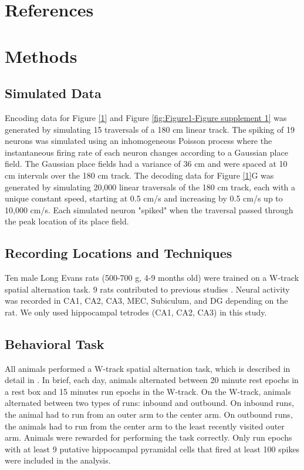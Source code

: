 \documentclass[times, twoside]{zHenriquesLab-StyleBioRxiv}
\begin{document}
\section*{References}


\onecolumn
\newpage

\section*{Methods}

\subsection*{Simulated Data}
Encoding data for Figure \ref{1} and Figure \ref{fig:Figure1-Figure supplement 1} was generated by simulating 15 traversals of a 180 cm linear track. The spiking of 19 neurons was simulated using an inhomogeneous Poisson process where the instantaneous firing rate of each neuron changes according to a Gaussian place field. The Gaussian place fields had a variance of 36 cm and were spaced at 10 cm intervals over the 180 cm track. The decoding data for Figure \ref{1}G was generated by simulating 20,000 linear traversals of the 180 cm track, each with a unique constant speed, starting at 0.5 cm/s and increasing by 0.5 cm/s up to 10,000 cm/s. Each simulated neuron "spiked" when the traversal passed through the peak location of its place field.

\subsection*{Recording Locations and Techniques}
Ten male Long Evans rats (500-700 g, 4-9 months old) were trained on a W-track spatial alternation task. 9 rats contributed to previous studies \cite{KarlssonAwakereplayremote2009, KayConstantSubsecondCycling2020, Kayhippocampalnetworkspatial2016, CarrTransientSlowGamma2012}. Neural activity was recorded in CA1, CA2, CA3, MEC, Subiculum, and DG depending on the rat. We only used hippocampal tetrodes (CA1, CA2, CA3) in this study.

\subsection*{Behavioral Task}
All animals performed a W-track spatial alternation task, which is described in detail in \cite{KarlssonAwakereplayremote2009}. In brief, each day, animals alternated between 20 minute rest epochs in a rest box and 15 minutes run epochs in the W-track. On the W-track, animals alternated between two types of runs: inbound and outbound. On inbound runs, the animal had to run from an outer arm to the center arm. On outbound runs, the animals had to run from the center arm to the least recently visited outer arm. Animals were rewarded for performing the task correctly. Only run epochs with at least 9 putative hippocampal pyramidal cells that fired at least 100 spikes were included in the analysis.
\end{document}
